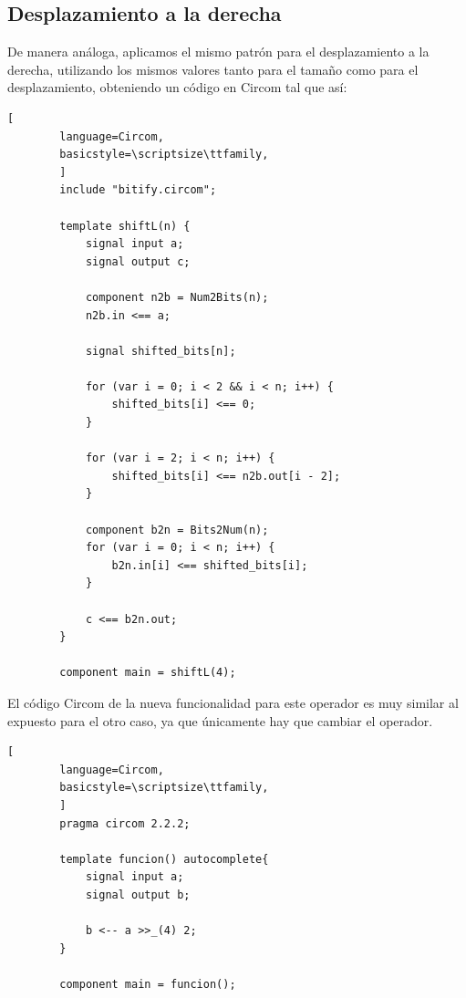 \documentclass[a4paper,12pt]{report}
\begin{document}
	
	
	\subsection{Desplazamiento a la derecha}
	\label{sec:ver-despdcha}
	\vspace{0.2cm}
	\noindent De manera análoga, aplicamos el mismo patrón para el desplazamiento a la derecha, utilizando los mismos valores tanto para el tamaño como para el desplazamiento, obteniendo un código en Circom tal que así:
	
	\vspace{0.2cm}
	\begin{lstlisting}[
		language=Circom,
		basicstyle=\scriptsize\ttfamily, 
		]
		include "bitify.circom";
		
		template shiftL(n) {
			signal input a;
			signal output c;
			
			component n2b = Num2Bits(n);
			n2b.in <== a;
			
			signal shifted_bits[n];
			
			for (var i = 0; i < 2 && i < n; i++) {
				shifted_bits[i] <== 0;
			}
			
			for (var i = 2; i < n; i++) {
				shifted_bits[i] <== n2b.out[i - 2];
			}
			
			component b2n = Bits2Num(n);
			for (var i = 0; i < n; i++) {
				b2n.in[i] <== shifted_bits[i];
			}
			
			c <== b2n.out;
		}
		
		component main = shiftL(4);
	\end{lstlisting}
	
	\vspace{0.2cm}
	\noindent El código Circom de la nueva funcionalidad para este operador es muy similar al expuesto para el otro caso, ya que únicamente hay que cambiar el operador.
	
	\vspace{0.2cm}
	\begin{lstlisting}[
		language=Circom,
		basicstyle=\scriptsize\ttfamily, 
		]
		pragma circom 2.2.2;
		
		template funcion() autocomplete{
			signal input a;
			signal output b;
			
			b <-- a >>_(4) 2;
		}
		
		component main = funcion();
		
	\end{lstlisting}
	
\end{document}
